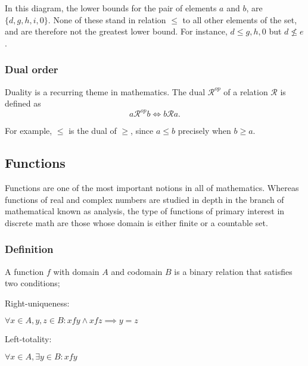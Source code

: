 \documentclass[11pt]{article}
\theoremstyle{plain}
\theoremstyle{definition}
\newenvironment{packed_enum}{
\begin{enumerate}
  \setlength{\itemsep}{1pt}
  \setlength{\parskip}{0pt}
  \setlength{\parsep}{0pt}
}{\end{enumerate}}
\begin{document}
\begin{center}
  \def\svgwidth{0.3\columnwidth}
  
\end{center}

\noindent In this diagram, the lower bounds for the pair of elements $ a $ and $ b $, are $ \{ d, g, h, i, 0 \} $. None of these stand in relation $ \le $ to all other elements of the set, and are therefore not the greatest lower bound. For instance, $ d \le g, h, 0 $ but $ d \not \le e $.

\subsubsection*{Dual order}

Duality is a recurring theme in mathematics. The dual $ \mathcal{R}^{op} $ of a relation $ \mathcal{R} $ is defined as
$$
  a \mathcal{R}^{op} b \iff b \mathcal{R} a.
$$

\noindent For example, $ \le $ is the dual of $ \ge $, since $ a \le b $ precisely when $ b \ge a $.

\subsection*{Functions}

Functions are one of the most important notions in all of mathematics. Whereas functions of real and complex numbers are studied in depth in the branch of mathematical known as analysis,
the type of functions of primary interest in discrete math are those whose domain is either finite or a countable set.

\subsubsection*{Definition}

A function $ f $ with domain $ A $ and codomain $ B $ is a binary relation that satisfies two conditions;

\begin{packed_enum}
  \item \begin{em}Right-uniqueness:\end{em} $ \forall x \in A, y, z \in B : x f y \wedge x f z \implies y = z $
  \item \begin{em}Left-totality:\end{em} $ \forall x \in A, \exists y \in B : x f y $
\end{packed_enum}
\end{document}
